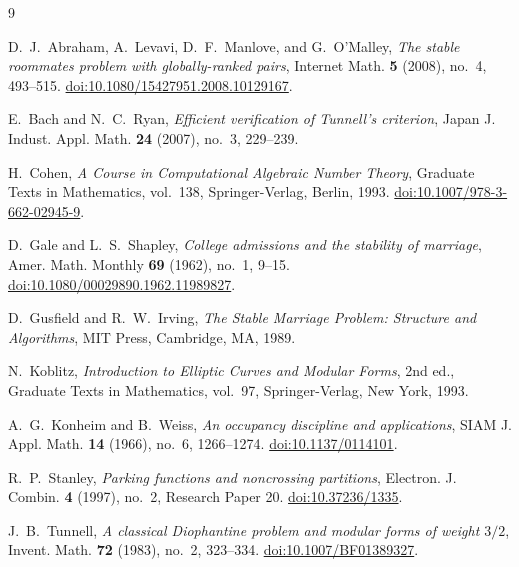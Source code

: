 \documentclass[11pt]{amsart}
\theoremstyle{definition}
\theoremstyle{remark}
\begin{document}
\begin{thebibliography}{9}

D.~J.~Abraham, A.~Levavi, D.~F.~Manlove, and G.~O'Malley,
\emph{The stable roommates problem with globally-ranked pairs},
Internet Math. \textbf{5} (2008), no.~4, 493--515.
\href{https://doi.org/10.1080/15427951.2008.10129167}
{doi:10.1080/15427951.2008.10129167}.

E.~Bach and N.~C.~Ryan,
\emph{Efficient verification of Tunnell's criterion},
Japan J. Indust. Appl. Math. \textbf{24} (2007), no.~3, 229--239.

H.~Cohen,
\emph{A Course in Computational Algebraic Number Theory},
Graduate Texts in Mathematics, vol.~138, Springer-Verlag, Berlin, 1993.
\href{https://doi.org/10.1007/978-3-662-02945-9}
{doi:10.1007/978-3-662-02945-9}.

D.~Gale and L.~S.~Shapley,
\emph{College admissions and the stability of marriage},
Amer. Math. Monthly \textbf{69} (1962), no.~1, 9--15.
\href{https://doi.org/10.1080/00029890.1962.11989827}
{doi:10.1080/00029890.1962.11989827}.

D.~Gusfield and R.~W.~Irving,
\emph{The Stable Marriage Problem: Structure and Algorithms},
MIT Press, Cambridge, MA, 1989.

N.~Koblitz,
\emph{Introduction to Elliptic Curves and Modular Forms},
2nd ed., Graduate Texts in Mathematics, vol.~97,
Springer-Verlag, New York, 1993.

A.~G.~Konheim and B.~Weiss,
\emph{An occupancy discipline and applications},
SIAM J. Appl. Math. \textbf{14} (1966), no.~6, 1266--1274.
\href{https://doi.org/10.1137/0114101}{doi:10.1137/0114101}.

R.~P.~Stanley,
\emph{Parking functions and noncrossing partitions},
Electron. J. Combin. \textbf{4} (1997), no.~2, Research Paper 20.
\href{https://doi.org/10.37236/1335}{doi:10.37236/1335}.

J.~B.~Tunnell,
\emph{A classical Diophantine problem and modular forms of weight $3/2$},
Invent. Math. \textbf{72} (1983), no.~2, 323--334.
\href{https://doi.org/10.1007/BF01389327}{doi:10.1007/BF01389327}.

\end{thebibliography}
\end{document}
